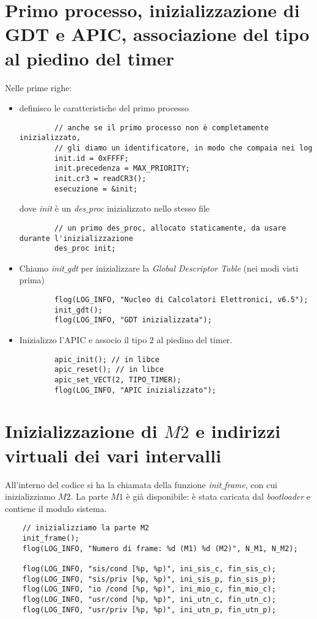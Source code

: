 \section{Primo processo, inizializzazione di GDT e APIC, associazione del tipo al piedino del timer}
Nelle prime righe:
\begin{itemize}
	\item definisco le caratteristiche del primo processo
	\begin{verbatim}
		// anche se il primo processo non è completamente inizializzato,
		// gli diamo un identificatore, in modo che compaia nei log
		init.id = 0xFFFF;
		init.precedenza = MAX_PRIORITY;
		init.cr3 = readCR3();
		esecuzione = &init;
	\end{verbatim}
	dove \emph{init} è un \emph{des$\_$proc} inizializzato nello stesso file
	\begin{verbatim}
		// un primo des_proc, allocato staticamente, da usare durante l'inizializzazione
		des_proc init;
	\end{verbatim}
	\item Chiamo \emph{init$\_$gdt} per inizializzare la \emph{Global Descriptor Table} (nei modi visti prima)
	\begin{verbatim}
		flog(LOG_INFO, "Nucleo di Calcolatori Elettronici, v6.5");
		init_gdt();
		flog(LOG_INFO, "GDT inizializzata");
	\end{verbatim}
	\item Inizializzo l'APIC e associo il tipo $2$ al piedino del timer.
	\begin{verbatim}
		apic_init(); // in libce
		apic_reset(); // in libce
		apic_set_VECT(2, TIPO_TIMER);
		flog(LOG_INFO, "APIC inizializzato");
	\end{verbatim}
\end{itemize}
\small

\normalsize 
\section{Inizializzazione di $M2$ e indirizzi virtuali dei vari intervalli}	
All'interno del codice si ha la chiamata della funzione \emph{init$\_$frame}, con cui inizializziamo $M2$. La parte $M1$ è già disponibile: è stata caricata dal \emph{bootloader} e contiene il modulo sistema.
\small 
\begin{verbatim}
	// inizializziamo la parte M2
	init_frame();
	flog(LOG_INFO, "Numero di frame: %d (M1) %d (M2)", N_M1, N_M2);
	
	flog(LOG_INFO, "sis/cond [%p, %p)", ini_sis_c, fin_sis_c);
	flog(LOG_INFO, "sis/priv [%p, %p)", ini_sis_p, fin_sis_p);
	flog(LOG_INFO, "io /cond [%p, %p)", ini_mio_c, fin_mio_c);
	flog(LOG_INFO, "usr/cond [%p, %p)", ini_utn_c, fin_utn_c);
	flog(LOG_INFO, "usr/priv [%p, %p)", ini_utn_p, fin_utn_p);
\end{verbatim}
\normalsize 
